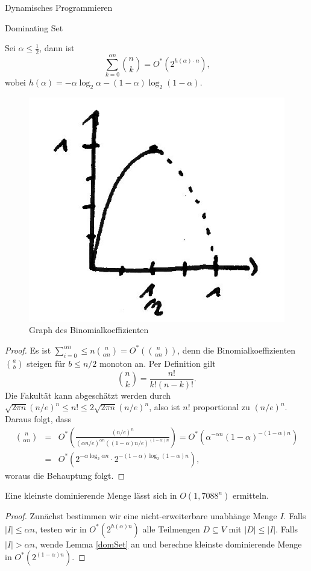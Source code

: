 \begin{chapter}{Dynamisches Programmieren}
\begin{section}{Dominating Set}
  \begin{lemma}[Hilfslemma]
    Sei $\alpha \leq \frac{1}{2}$, dann ist
    \[\sum_{k=0}^{\alpha n} \binom{n}{k} = O^*(2^{h(\alpha) \cdot n})\text{,}\]
    wobei $h(\alpha) = -\alpha\log_2 \alpha - (1-\alpha) \log_2 (1-\alpha)$.
      \begin{figure}[H]
	\centering
	\includegraphics[width=.25\textwidth]{./Bilder/b01.jpg}
	\caption{Graph des Binomialkoeffizienten}
      \end{figure}
  \end{lemma}
  \begin{proof}
    Es ist \( \sum_{i=0}^{\alpha n} \leq n \binom{n}{\alpha n} = O^*( \binom{n}{\alpha n} ) \), denn die Binomialkoeffizienten \( \binom{a}{b} \) steigen für \(b \leq n/2\) monoton an. Per Definition gilt 
    \[ \binom{n}{k} = \frac{n!}{k! (n-k)!}. \]
    Die Fakultät kann abgeschätzt werden durch \( \sqrt{2 \pi n} (n/e)^n \leq n! \leq 2 \sqrt{2 \pi n} (n/e)^n \), also ist \(n!\) proportional zu \((n/e)^n\). Daraus folgt, dass 
    \begin{eqnarray*}
      \binom{n}{\alpha n} &=& O^* \left( \frac{(n/e)^n}{(\alpha n/e)^{\alpha n} ( (1-\alpha)n/e)^{(1-\alpha) n}} \right) = O^* \left( \alpha^{-\alpha n} (1-\alpha)^{-(1-\alpha)n} \right) \\
      &=& O^* \left( 2^{-\alpha \log_2 \alpha n} \cdot 2^{-(1 - \alpha) \log_2(1-\alpha)n} \right),
    \end{eqnarray*}
    woraus die Behauptung folgt.
  \end{proof}

  \begin{theorem}
    Eine kleinste dominierende Menge lässt sich in \(O(1{,}7088^n)\) ermitteln.
  \end{theorem}
  \begin{proof}
    Zunächst bestimmen wir eine nicht-erweiterbare unabhänge Menge \(I\). 
    Falls \(|I| \leq \alpha n\), testen wir in \(O^*(2^{h(\alpha) n})\) alle Teilmengen \(D \subseteq V\) mit \(|D| \leq |I|\).
    Falls \(|I| > \alpha n\), wende Lemma \ref{domSet} an und berechne kleinste dominierende Menge in \(O^*(2^{(1-\alpha)n})\). %
    

\end{proof}
\end{section}
\end{chapter}
